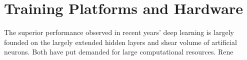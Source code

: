 \section{Training Platforms and Hardware}
The superior performance observed in recent years' deep learning is largely founded on the largely extended hidden layers and shear volume of artificial neurons. Both have put demanded for large computational resources. Rene